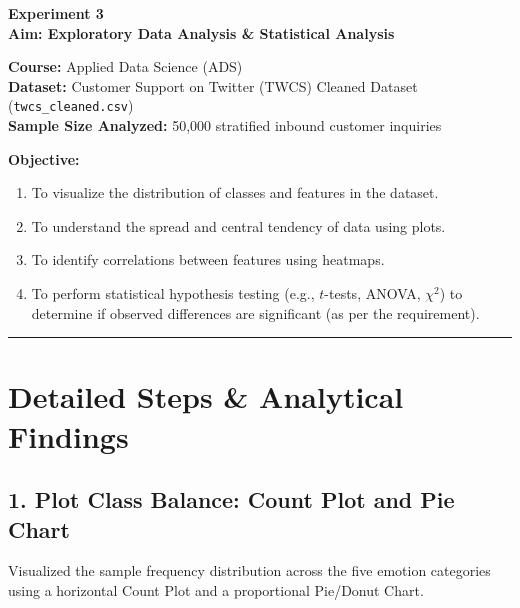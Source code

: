 \documentclass[11pt, a4paper]{article}
\begin{document}
\begin{center}
    {\LARGE \textbf{Experiment 3}} \\[0.4em]
    {\large \textbf{Aim: Exploratory Data Analysis \& Statistical Analysis}}
\end{center}

\vspace{0.5em}
\noindent \textbf{Course:} Applied Data Science (ADS) \\
\noindent \textbf{Dataset:} Customer Support on Twitter (TWCS) Cleaned Dataset (\texttt{twcs\_cleaned.csv}) \\
\noindent \textbf{Sample Size Analyzed:} 50,000 stratified inbound customer inquiries

\vspace{0.8em}
\noindent \textbf{Objective:}
\begin{enumerate}[leftmargin=1.5em]
    \item To visualize the distribution of classes and features in the dataset.
    \item To understand the spread and central tendency of data using plots.
    \item To identify correlations between features using heatmaps.
    \item To perform statistical hypothesis testing (e.g., $t$-tests, ANOVA, $\chi^2$) to determine if observed differences are significant (as per the requirement).
\end{enumerate}

\vspace{0.5em}
\hrule
\vspace{0.8em}

\section*{Detailed Steps \& Analytical Findings}

\subsection*{1. Plot Class Balance: Count Plot and Pie Chart}
Visualized the sample frequency distribution across the five emotion categories using a horizontal Count Plot and a proportional Pie/Donut Chart.
\end{document}
